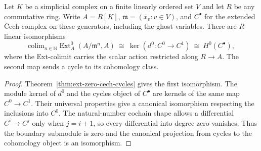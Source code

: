 \begin{theorem}\label{thm:ext-zero-cech-cohomology}
Let $K$ be a simplicial complex on a finite linearly ordered set $V$ and
let $R$ be any commutative ring. Write $A=R[K]$,
$\mathfrak m=(\bar x_v:v\in V)$, and $C^\bullet$ for the extended Čech
complex on these generators, including the ghost variables. There are
$R$-linear isomorphisms
\[
  \mathrm{colim}_{n\in\mathbb N}\operatorname{Ext}^0_A(A/\mathfrak m^n,A)
  \ \cong\ \ker(d^0:C^0\longrightarrow C^1)
  \ \cong\ H^0(C^\bullet),
\]
where the Ext-colimit carries the scalar action restricted along $R\to A$.
The second map sends a cycle to its cohomology class.
\leanok
\end{theorem}
\begin{proof}
Theorem~\ref{thm:ext-zero-cech-cycles} gives the first isomorphism.
The module kernel of $d^0$ and the cycles object of $C^\bullet$ are
kernels of the same map $C^0\to C^1$. Their universal properties give a
canonical isomorphism respecting the inclusions into $C^0$.
The natural-number cochain shape allows a differential $C^i\to C^j$
only when $j=i+1$, so every differential into degree zero vanishes.
Thus the boundary submodule is zero and the canonical projection from
cycles to the cohomology object is an isomorphism.
\end{proof}


